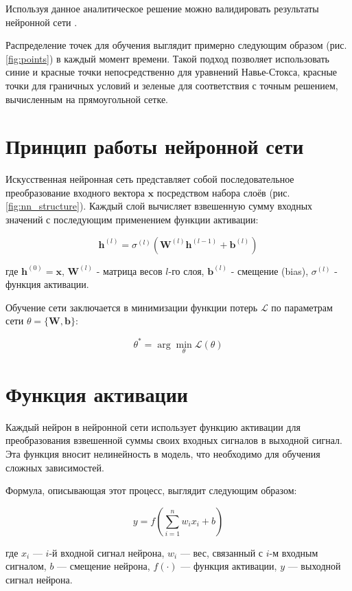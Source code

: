 

Используя данное аналитическое решение можно валидировать результаты нейронной сети .

Распределение точек для обучения выглядит примерно следующим образом
(рис. \ref{fig:points}) в каждый момент времени. Такой подход позволяет использовать
синие и красные точки непосредственно для  уравнений Навье-Стокса, красные точки для
граничных условий и зеленые для соответствия с точным решением, вычисленным на прямоугольной
сетке.


\section{Принцип работы нейронной сети}

Искусственная нейронная сеть представляет собой последовательное преобразование
входного вектора $\mathbf{x}$ посредством набора слоёв (рис. \ref{fig:nn_structure}).
Каждый слой вычисляет взвешенную сумму входных значений с последующим применением
функции активации:



$$
\mathbf{h}^{(l)} = \sigma^{(l)}\left( \mathbf{W}^{(l)} \mathbf{h}^{(l-1)} + \mathbf{b}^{(l)} \right)
$$

где $\mathbf{h}^{(0)} = \mathbf{x}$, $\mathbf{W}^{(l)}$ - матрица весов $l$-го слоя, $\mathbf{b}^{(l)}$ - смещение (bias), $\sigma^{(l)}$ - функция активации.

Обучение сети заключается в минимизации функции потерь $\mathcal{L}$ по параметрам сети $\theta = \{\mathbf{W}, \mathbf{b}\}$:

$$
\theta^* = \arg\min_\theta \mathcal{L}(\theta)
$$


\section{Функция активации}
Каждый нейрон в нейронной сети использует функцию активации для преобразования взвешенной
суммы своих входных сигналов в выходной сигнал. Эта функция вносит нелинейность в модель,
что необходимо для обучения сложных зависимостей.

Формула, описывающая этот процесс, выглядит следующим образом:

$$y = f(\sum_{i=1}^{n} w_i x_i + b)$$

где $x_i$ — $i$-й входной сигнал нейрона, $w_i$ — вес, связанный с $i$-м входным сигналом, $b$
— смещение нейрона, $f(\cdot)$ — функция активации, $y$ — выходной сигнал нейрона.


